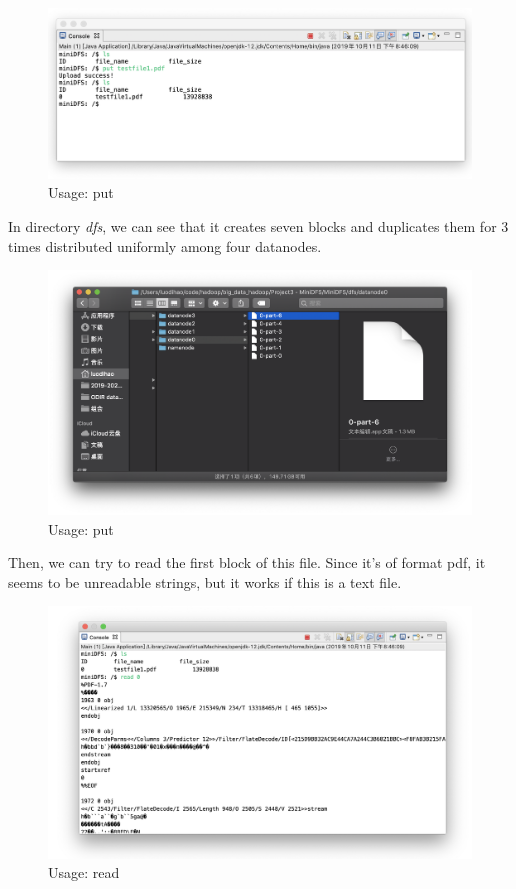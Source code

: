 \documentclass[10pt]{article}
\begin{document}
\begin{figure}[H]
\centerline{\includegraphics[width = 1\textwidth]{screenshot//put_01.png}}
\caption{Usage: put}
\end{figure}

In directory \textit{dfs}, we can see that it creates seven blocks and duplicates them for 3 times distributed uniformly among four datanodes.

\begin{figure}[H]
\centerline{\includegraphics[width = 1\textwidth]{screenshot//put_02.png}}
\caption{Usage: put}
\end{figure}

Then, we can try to read the first block of this file. Since it's of format pdf, it seems to be unreadable strings, but it works if this is a text file.

\begin{figure}[H]
\centerline{\includegraphics[width = 1\textwidth]{screenshot//read_01.png}}
\caption{Usage: read}
\end{figure}
\end{document}
